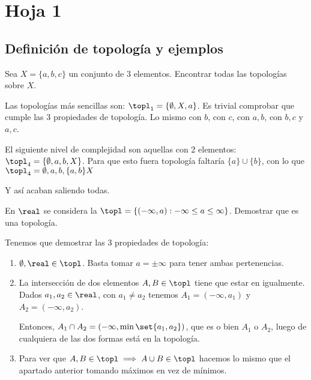\section{Hoja 1}

\subsection{Definición de topología y ejemplos}

\begin{problem}[1]
Sea $X=\{a,b,c\}$ un conjunto de 3 elementos. Encontrar todas las topologías sobre $X$.
\solution

Las topologías más sencillas son: $\topl_1 = \{\emptyset,X,a\}$. Es trivial comprobar que cumple las 3 propiedades de topología. Lo mismo con $b$, con $c$, con ${a,b}$, con ${b,c}$ y ${a,c}$.

El siguiente nivel de complejidad son aquellas con 2 elementos: $\topl_4 = \{\emptyset,a,b,X\}$. Para que esto fuera topología faltaría $\{a\} \cup \{b\}$, con lo que $\topl_4 = {\emptyset,a,b,\{a,b\}X}$

Y así acaban saliendo todas.
\end{problem}

\begin{problem}[2]
En $\real$ se considera la $\topl =\{(-\infty,a): -\infty \leq a \leq \infty\}$. Demostrar que es una topología.
\solution

Tenemos que demostrar las 3 propiedades de topología:

\begin{enumerate}
\item $\emptyset,\real \in \topl$. Basta tomar $a=\pm \infty$ para tener ambas pertenencias.
\item La intersección de dos elementos $A,B\in\topl$ tiene que estar en \topl igualmente. Dados $a_1,a_2\in\real$, con $a_1\neq a_2$ tenemos $A_1 = (-\infty,a_1)$ y $A_2 = (-\infty,a_2)$.

Entonces, $A_1\cap A_2 = (-\infty,\min \set{a_1,a_2})$, que es o bien $A_1$ o $A_2$, luego de cualquiera de las dos formas está en la topología.

\item Para ver que $A,B\in\topl \implies A\cup B\in\topl$ hacemos lo mismo que el apartado anterior tomando máximos en vez de mínimos.
\end{enumerate}
\end{problem}


